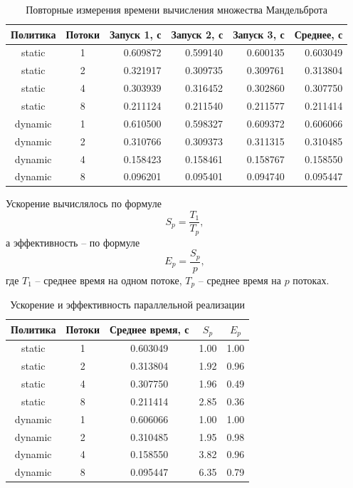 \documentclass[12pt,a4paper]{article}
\begin{document}
\begin{table}[H]
\centering
\caption{Повторные измерения времени вычисления множества Мандельброта}
\small
\begin{tabular}{ccrrrr}
\toprule
Политика & Потоки & Запуск 1, с & Запуск 2, с & Запуск 3, с & Среднее, с \\
\midrule
static  & 1 & 0.609872 & 0.599140 & 0.600135 & 0.603049 \\
static  & 2 & 0.321917 & 0.309735 & 0.309761 & 0.313804 \\
static  & 4 & 0.303939 & 0.316452 & 0.302860 & 0.307750 \\
static  & 8 & 0.211124 & 0.211540 & 0.211577 & 0.211414 \\
\midrule
dynamic & 1 & 0.610500 & 0.598327 & 0.609372 & 0.606066 \\
dynamic & 2 & 0.310766 & 0.309373 & 0.311315 & 0.310485 \\
dynamic & 4 & 0.158423 & 0.158461 & 0.158767 & 0.158550 \\
dynamic & 8 & 0.096201 & 0.095401 & 0.094740 & 0.095447 \\
\bottomrule
\end{tabular}
\end{table}

Ускорение вычислялось по формуле
\[
S_p=\frac{T_1}{T_p},
\]
а эффективность -- по формуле
\[
E_p=\frac{S_p}{p},
\]
где $T_1$ -- среднее время на одном потоке, $T_p$ -- среднее время на $p$ потоках.

\begin{table}[H]
\centering
\caption{Ускорение и эффективность параллельной реализации}
\begin{tabular}{ccccc}
\toprule
Политика & Потоки & Среднее время, с & $S_p$ & $E_p$ \\
\midrule
static  & 1 & 0.603049 & 1.00 & 1.00 \\
static  & 2 & 0.313804 & 1.92 & 0.96 \\
static  & 4 & 0.307750 & 1.96 & 0.49 \\
static  & 8 & 0.211414 & 2.85 & 0.36 \\
\midrule
dynamic & 1 & 0.606066 & 1.00 & 1.00 \\
dynamic & 2 & 0.310485 & 1.95 & 0.98 \\
dynamic & 4 & 0.158550 & 3.82 & 0.96 \\
dynamic & 8 & 0.095447 & 6.35 & 0.79 \\
\bottomrule
\end{tabular}
\end{table}
\end{document}
